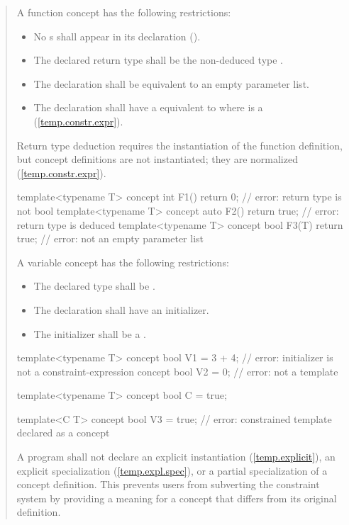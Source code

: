 \begin{quote}
\pnum
A function concept has the following restrictions:
\begin{itemize}
\item No s shall
     appear in its declaration ().
\item The declared return type shall be the non-deduced type .

\item The declaration shall be equivalent to an empty parameter list.

\item The declaration shall have a  equivalent
to  where  is a 
 (\ref{temp.constr.expr}).
\end{itemize}
%
\enternote
Return type deduction requires the instantiation of the function 
definition, but concept definitions are not instantiated; they
are normalized (\ref{temp.constr.expr}).
\exitnote
%
\enterexample
\begin{codeblock}
template<typename T> 
  concept int F1() { return 0; }      // error: return type is not bool
template<typename T> 
  concept auto F2() { return true; }  // error: return type is deduced
template<typename T> 
  concept bool F3(T) { return true; } // error: not an empty parameter list
\end{codeblock}
\exitexample

\pnum
A variable concept has the following restrictions:
\begin{itemize}
\item The declared type shall be .
\item The declaration shall have an initializer.
\item The initializer shall be a .
\end{itemize}
%
\enterexample
\begin{codeblock}
template<typename T> 
  concept bool V1 = 3 + 4; // error: initializer is not a constraint-expression
concept bool V2 = 0;       // error: not a template

template<typename T> concept bool C = true;

template<C T> 
  concept bool V3 = true;  // error: constrained template declared as a concept
\end{codeblock}
\exitexample

\pnum
A program shall not declare an explicit instantiation (\ref{temp.explicit}), 
an explicit specialization (\ref{temp.expl.spec}), or a partial specialization
of a concept definition.
%
\enternote
This prevents users from subverting the constraint system by providing a 
meaning for a concept that differs from its original definition.
\exitnote

\end{quote}
